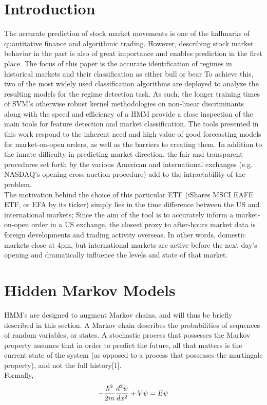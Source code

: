 \documentclass[]{hdsr}
\begin{document}
\section{Introduction}
\label{sec1}
The accurate prediction of stock market movements is one of the hallmarks of quantitative finance and algorithmic trading. However, describing stock market behavior in the past is also of great importance and enables prediction in the first place. The focus of this paper is the accurate identification of regimes in historical markets and their classification as either bull or bear  To achieve this, two of the most widely used classification algorithms are deployed to analyze the resulting models for the regime detection task. As such, the longer training times of SVM's otherwise robust kernel methodologies on non-linear discriminants along with the speed and efficiency of a HMM provide a close inspection of the main tools for feature detection and market classification. The tools presented in this work respond to the inherent need and high value of good forecasting models for market-on-open orders, as well as the barriers to creating them. In addition to the innate difficulty in predicting market direction, the fair and transparent procedures set forth by the various American and international exchanges (e.g. NASDAQ's opening cross auction procedure) add to the intractability of the problem.\\
The motivation behind the choice of this particular ETF (iShares MSCI EAFE ETF, or EFA by its ticker) simply lies in the time difference between the US and international markets; Since the aim of the tool is to accurately inform a market-on-open order in a US exchange, the closest proxy to after-hours market data is foreign developments and trading activity overseas. In other words, domestic markets close at 4pm, but international markets are active before the next day's opening and dramatically influence the levels and state of that market.


\section{Hidden Markov Models}
\label{sec2}
HMM’s are designed to augment Markov chains, and will thus be briefly described in this section. A Markov chain describes the probabilities of sequences of random variables, or states. A stochastic process that possesses the Markov property assumes that in order to predict the future, all that matters is the current state of the system (as opposed to a process that possesses the martingale property), and not the full history[1].
\\
Formally,
\begin{equation}
-\frac{\hbar^2}{2m} \frac{d^2 \psi}{dx^2} + V\psi = E\psi\\
\end{equation}
\end{document}
